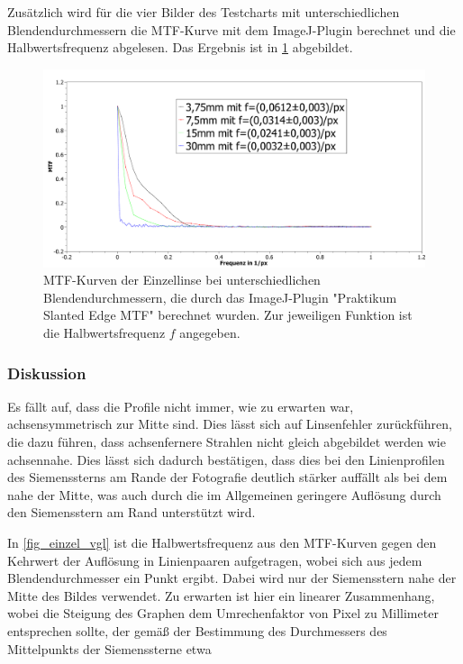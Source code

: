 \documentclass[
	a4paper,
	12pt,
	pagesize,
	ngerman
]{scrartcl}
\begin{document}
	Zusätzlich wird für die vier Bilder des Testcharts mit unterschiedlichen Blendendurchmessern die MTF-Kurve  mit dem ImageJ-Plugin berechnet und die Halbwertsfrequenz abgelesen.
	Das Ergebnis ist in \cref{fig_einzel_mtf} abgebildet.
	
	\begin{figure}[H]  
		\includegraphics[width=1\textwidth]{fig_Einzellinse_MTF}
		\centering
		\caption{
			MTF-Kurven der Einzellinse bei unterschiedlichen Blendendurchmessern, die durch das ImageJ-Plugin "Praktikum Slanted Edge MTF" berechnet wurden.
			Zur jeweiligen Funktion ist die Halbwertsfrequenz $f$ angegeben.
		}
		\label{fig_einzel_mtf}
		\centering
	\end{figure}
	

	\subsubsection{Diskussion}
	
	Es fällt auf, dass die Profile nicht immer, wie zu erwarten war, achsensymmetrisch zur Mitte sind.
	Dies lässt sich auf Linsenfehler zurückführen, die dazu führen, dass achsenfernere Strahlen nicht gleich abgebildet werden wie achsennahe.
	Dies lässt sich dadurch bestätigen, dass dies bei den Linienprofilen des Siemenssterns am Rande der Fotografie deutlich stärker auffällt als bei dem nahe der Mitte, was auch durch die im Allgemeinen geringere Auflösung durch den Siemensstern am Rand unterstützt wird.
	
	In \cref{fig_einzel_vgl} ist die Halbwertsfrequenz aus den MTF-Kurven gegen den Kehrwert der Auflösung in Linienpaaren aufgetragen, wobei sich aus jedem Blendendurchmesser ein Punkt ergibt.
	Dabei wird nur der Siemensstern nahe der Mitte des Bildes verwendet.
	Zu erwarten ist hier ein linearer Zusammenhang, wobei die Steigung des Graphen dem Umrechenfaktor von Pixel zu Millimeter entsprechen sollte, der gemäß der Bestimmung des Durchmessers des Mittelpunkts der Siemenssterne etwa
	
\end{document}
